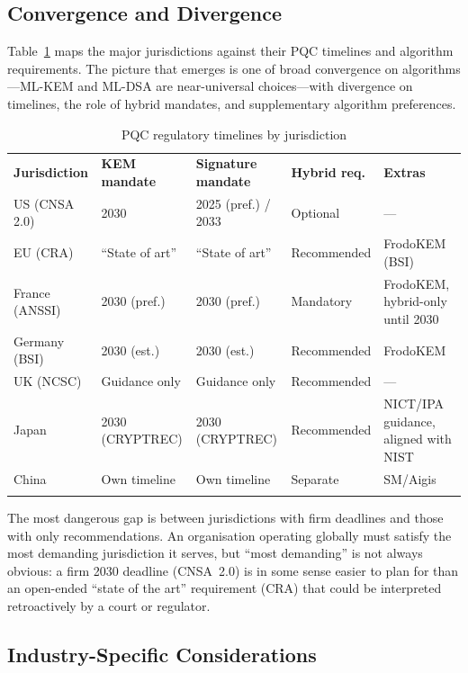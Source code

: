 \subsection{Convergence and Divergence}
\label{subsec:convergence-divergence}

Table~\ref{tab:regulatory-timeline} maps the major jurisdictions against their PQC timelines and algorithm requirements. The picture that emerges is one of broad convergence on algorithms---ML-KEM and ML-DSA are near-universal choices---with divergence on timelines, the role of hybrid mandates, and supplementary algorithm preferences.

\begin{table}[t]
\caption{PQC regulatory timelines by jurisdiction}
\label{tab:regulatory-timeline}
\begin{tabular}{p{2.2cm}p{2.5cm}p{2.8cm}p{2cm}p{2cm}}
\hline\noalign{\smallskip}
\textbf{Jurisdiction} & \textbf{KEM mandate} & \textbf{Signature mandate} & \textbf{Hybrid req.} & \textbf{Extras} \\
\noalign{\smallskip}\svhline\noalign{\smallskip}
US (CNSA 2.0) & 2030 & 2025 (pref.) / 2033 & Optional & --- \\
EU (CRA) & ``State of art'' & ``State of art'' & Recommended & FrodoKEM (BSI) \\
France (ANSSI) & 2030 (pref.) & 2030 (pref.) & Mandatory & FrodoKEM, hybrid-only until 2030 \\
Germany (BSI) & 2030 (est.) & 2030 (est.) & Recommended & FrodoKEM \\
UK (NCSC) & Guidance only & Guidance only & Recommended & --- \\
Japan & 2030 (CRYPTREC) & 2030 (CRYPTREC) & Recommended & NICT/IPA guidance, aligned with NIST \\
China & Own timeline & Own timeline & Separate & SM/Aigis \\
\noalign{\smallskip}\hline
\end{tabular}
\end{table}

The most dangerous gap is between jurisdictions with firm deadlines and those with only recommendations. An organisation operating globally must satisfy the most demanding jurisdiction it serves, but ``most demanding'' is not always obvious: a firm 2030 deadline (CNSA~2.0) is in some sense easier to plan for than an open-ended ``state of the art'' requirement (CRA) that could be interpreted retroactively by a court or regulator.

\subsection{Industry-Specific Considerations}
\label{subsec:industry-specific}

